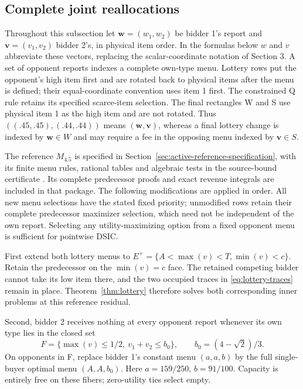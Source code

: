 

\subsection{Complete joint reallocations}\label{sec:joint-mechanism}

Throughout this subsection let $\mathbf w=(w_1,w_2)$ be bidder 1's report
and $\mathbf v=(v_1,v_2)$ bidder 2's, in physical item order. In the formulas
below $w$ and $v$ abbreviate these vectors, replacing the scalar-coordinate
notation of Section 3. A set of opponent reports indexes a complete own-type
menu. Lottery rows put the opponent's high item first and are rotated back to
physical items after the menu is defined; their equal-coordinate convention
uses item 1 first. The constrained Q rule retains its specified scarce-item
selection. The final rectangles W and S use physical item 1 as the high item and
are not rotated. Thus $((.45,.45),(.44,.44))$ means $(\mathbf w,\mathbf v)$,
whereas a final lottery change is indexed by $\mathbf w\in W$ and may require
a fee in the opposing menu indexed by $\mathbf v\in S$.

The reference $M_{4.5}$ is specified in
Section~\ref{sec:active-reference-specification}, with its finite menu rules,
rational tables and algebraic tests in the source-bound
certificate . Its complete
predecessor proofs and exact revenue integrals are included in that package.
The following modifications are applied in order. All new menu selections
have the stated fixed priority; unmodified rows retain their complete
predecessor maximizer selection, which need not be independent of the own
report. Selecting any utility-maximizing option from a fixed opponent menu
is sufficient for pointwise DSIC.

First extend both lottery menus to
$E^+=\{A<\max(v)<T,\min(v)<c\}$. Retain the predecessor on the
$\min(v)=c$ face. The retained competing bidder cannot take its low item
there, and the two occupied traces in \eqref{eq:lottery-traces} remain in
place. Theorem~\ref{thm:lottery} therefore solves both corresponding inner
problems at this reference residual.

Second, bidder 2 receives nothing at every opponent report whenever its
own type lies in the closed set
\[
F=\{\max(v)\le1/2,\ v_1+v_2\le b_0\},\qquad
b_0=(4-\sqrt2)/3.
\]
On opponents in F, replace bidder 1's constant menu $(a,a,b)$ by the full
single-buyer optimal menu $(A,A,b_0)$. Here $a=159/250$, $b=91/100$.
Capacity is entirely free on these fibers; zero-utility ties select empty.

